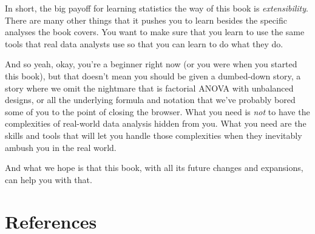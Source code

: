 \documentclass[
  11pt,
  a4paper,
  twoside,symmetric,openright]{book}
\theoremstyle{break}
\theoremstyle{break}
\begin{document}
In short, the big payoff for learning statistics the way of this book is \emph{extensibility}. There are many other things that it pushes you to learn besides the specific analyses the book covers. You want to make sure that you learn to use the same tools that real data analysts use so that you can learn to do what they do.

And so yeah, okay, you're a beginner right now (or you were when you started this book), but that doesn't mean you should be given a dumbed-down story, a story where we omit the nightmare that is factorial ANOVA with unbalanced designs, or all the underlying formula and notation that we've probably bored some of you to the point of closing the browser. What you need is \emph{not} to have the complexities of real-world data analysis hidden from you. What you need are the skills and tools that will let you handle those complexities when they inevitably ambush you in the real world.

And what we hope is that this book, with all its future changes and expansions, can help you with that.

\chapter*{References}\label{references}
\end{document}
